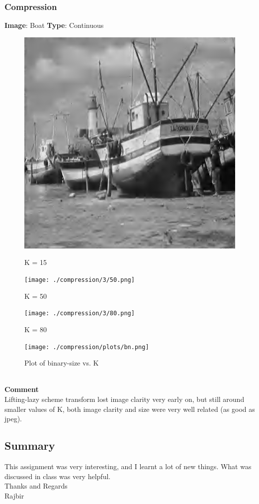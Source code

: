\documentclass{article}
\begin{document}
\pagebreak
\subsubsection*{Compression}

    \textbf{Image}: Boat  \textbf{Type}: Continuous\\
    \begin{figure}[!htb]
      \includegraphics[scale=0.4]{3/.report/compression/3/15.png}
      \caption{K = 15}
    \endminipage \hfill
      \texttt{[image: ./compression/3/50.png]}
      \caption{K = 50}
    \endminipage
    \end{figure}
    
    \begin{figure}[!htb]
      \texttt{[image: ./compression/3/80.png]}
      \caption{K = 80}
    \endminipage \hfill
      \texttt{[image: ./compression/plots/bn.png]}
      \caption{Plot of binary-size vs. K}
    \endminipage
    \end{figure}
    \\
    \textbf{Comment}\\
    Lifting-lazy scheme transform lost image clarity very early on, but still around smaller values of K, both image clarity and size were very well related (as good as jpeg).

\pagebreak
\subsection*{Summary}
    This assignment was very interesting, and I learnt a lot of new things. What was discussed in class was very helpful. \\
    Thanks and Regards\\
    Rajbir
\end{document}
